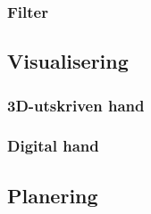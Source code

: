 \documentclass[a4paper]{article}
\begin{document}
\begin{sloppypar}
  \subsubsection{Filter}

  \subsection{Visualisering}
  \subsubsection{3D-utskriven hand}
  \subsubsection{Digital hand}

  \subsection{Planering}

\end{sloppypar}
\end{document}
